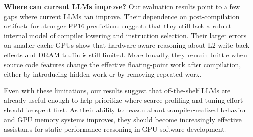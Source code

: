\textbf{Where can current LLMs improve?}
Our evaluation results point to a few gaps where current LLMs can improve.
Their dependence on post-compilation artifacts for stronger FP16 predictions suggests that they still lack a robust internal model of compiler lowering and instruction selection.
Their larger errors on smaller-cache GPUs show that hardware-aware reasoning about L2 write-back effects and DRAM traffic is still limited.
More broadly, they remain brittle when source code features change the effective floating-point work after compilation, either by introducing hidden work or by removing repeated work.

Even with these limitations, our results suggest that off-the-shelf LLMs are already useful enough to help prioritize where scarce profiling and tuning effort should be spent first.
As their ability to reason about compiler-realized behavior and GPU memory systems improves, they should become increasingly effective assistants for static performance reasoning in GPU software development.

